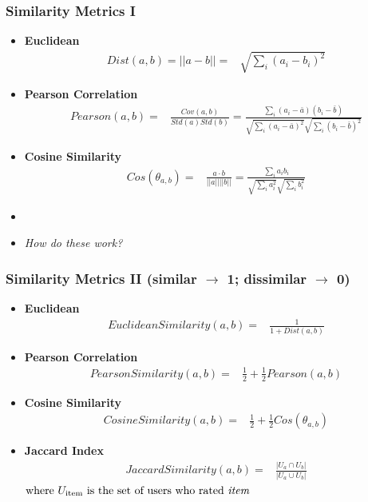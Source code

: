 \documentclass[xcolor={dvipsnames}]{beamer}
\begin{document}
\frame
{
\frametitle{Similarity Metrics I}


\begin{itemize}
\item<2-> \textbf{Euclidean}
\begin{align*} 
Dist(a, b) = ||a-b||  = {}& \sqrt{\sum_i (a_i - b_i)^2}
\end{align*} 
\item<3-> \textbf{Pearson Correlation}
\begin{align*} 
Pearson(a, b) ={}& \frac{Cov(a, b)}{Std(a)Std(b)} = \frac{{\sum_i (a_i - \bar a)(b_i - \bar b)}}{\sqrt{\sum_i (a_i - \bar a)^2} \sqrt{\sum_i (b_i - \bar b)^2}}
\end{align*} 

\item<4-> \textbf{Cosine Similarity}
\begin{align*} 
Cos(\theta_{a, b}) ={}& \frac{a\cdot b}{||a|| ||b||} = \frac{{\sum_i a_i b_i }}{\sqrt{\sum_i a_i^2} \sqrt{\sum_i b_i^2}}
\end{align*} 
\item[] 
\item<5-> \emph{How do these work? }

\end{itemize}



\vspace{2.5em}

}



\frame
{
\frametitle{Similarity Metrics II (similar $\rightarrow$ 1; dissimilar $\rightarrow$ 0)}


\begin{itemize}
\item \textbf{Euclidean}
\begin{align*} 
EuclideanSimilarity(a, b) ={}& \frac{1}{1+Dist(a, b)}
\end{align*} 
\item \textbf{Pearson Correlation}
\begin{align*} 
PearsonSimilarity(a, b) ={}& \frac{1}{2}+ \frac{1}{2} Pearson(a, b)
\end{align*} 

\item \textbf{Cosine Similarity}
\begin{align*} 
CosineSimilarity(a, b) ={}& \frac{1}{2}+ \frac{1}{2} Cos(\theta_{a, b})
\end{align*} 
\item<2-> \textbf{Jaccard Index}
\begin{align*}
JaccardSimilarity(a, b) ={}& \frac{|U_a \cap U_b|}{|U_a \cup U_b|}  
\end{align*} 
$\text{where }  U_{\text{item}} \text{ is the set of users who rated \emph{item}}$
\end{itemize}

}
\end{document}
